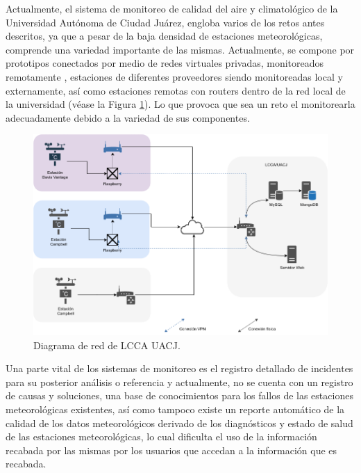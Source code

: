 
Actualmente, el sistema de monitoreo de calidad del aire y climatológico de la Universidad Autónoma de Ciudad Juárez, engloba varios de los retos antes descritos, ya que a pesar de la baja densidad de estaciones meteorológicas, comprende una variedad importante de las mismas. Actualmente, se compone por prototipos conectados por medio de redes virtuales privadas, monitoreados remotamente \cite{red_climatologica_uacj}, estaciones de diferentes proveedores siendo monitoreadas local y externamente, así como estaciones remotas con routers dentro de la red local de la universidad (véase la Figura \ref{fig:current_network}). Lo que provoca que sea un reto el monitorearla adecuadamente debido a la variedad de sus componentes.


\begin{figure}[!ht]
	\centering
	\includegraphics[width=.80\linewidth]{images/diagrams/current_network.png}
	\caption{Diagrama de red de LCCA UACJ.}
	\label{fig:current_network}
\end{figure}


Una parte vital de los sistemas de monitoreo es el registro detallado de incidentes para su posterior análisis o referencia y actualmente, no se cuenta con un registro de causas y soluciones, una base de conocimientos para los fallos de las estaciones meteorológicas existentes, así como tampoco existe un reporte automático de la calidad de los datos meteorológicos derivado de los diagnósticos y estado de salud de las estaciones meteorológicas, lo cual dificulta el uso de la información recabada por las mismas por los usuarios que accedan a la información que es recabada.


